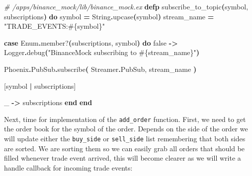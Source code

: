 \documentclass[
  oneside]{book}
\newenvironment{Shaded}{\begin{snugshade}}{\end{snugshade}}
\newcommand{\CommentTok}[1]{\textcolor[rgb]{0.56,0.35,0.01}{\textit{#1}}}
\newcommand{\ConstantTok}[1]{\textcolor[rgb]{0.56,0.35,0.01}{#1}}
\newcommand{\FunctionTok}[1]{\textcolor[rgb]{0.13,0.29,0.53}{\textbf{#1}}}
\newcommand{\KeywordTok}[1]{\textcolor[rgb]{0.13,0.29,0.53}{\textbf{#1}}}
\newcommand{\NormalTok}[1]{#1}
\newcommand{\OperatorTok}[1]{\textcolor[rgb]{0.81,0.36,0.00}{\textbf{#1}}}
\newcommand{\OtherTok}[1]{\textcolor[rgb]{0.56,0.35,0.01}{#1}}
\newcommand{\StringTok}[1]{\textcolor[rgb]{0.31,0.60,0.02}{#1}}
\begin{document}
\begin{Shaded}
\begin{Highlighting}[]
\CommentTok{\# /apps/binance\_mock/lib/binance\_mock.ex}
  \KeywordTok{defp}\NormalTok{ subscribe\_to\_topic}\FunctionTok{(}\NormalTok{symbol, subscriptions}\FunctionTok{)} \KeywordTok{do}
\NormalTok{    symbol }\OperatorTok{=} \ConstantTok{String}\OperatorTok{.}\NormalTok{upcase}\FunctionTok{(}\NormalTok{symbol}\FunctionTok{)}
\NormalTok{    stream\_name }\OperatorTok{=} \StringTok{"TRADE\_EVENTS:}\OtherTok{\#\{}\NormalTok{symbol}\OtherTok{\}}\StringTok{"}

    \KeywordTok{case} \ConstantTok{Enum}\OperatorTok{.}\NormalTok{member?}\FunctionTok{(}\NormalTok{subscriptions, symbol}\FunctionTok{)} \KeywordTok{do}
      \ConstantTok{false} \OperatorTok{{-}\textgreater{}}
        \ConstantTok{Logger}\OperatorTok{.}\NormalTok{debug}\FunctionTok{(}\StringTok{"BinanceMock subscribing to }\OtherTok{\#\{}\NormalTok{stream\_name}\OtherTok{\}}\StringTok{"}\FunctionTok{)}

        \ConstantTok{Phoenix}\OperatorTok{.}\ConstantTok{PubSub}\OperatorTok{.}\NormalTok{subscribe}\FunctionTok{(}
          \ConstantTok{Streamer}\OperatorTok{.}\ConstantTok{PubSub}\NormalTok{,}
\NormalTok{          stream\_name}
        \FunctionTok{)}

        \OtherTok{[}\NormalTok{symbol }\OperatorTok{|}\NormalTok{ subscriptions}\OtherTok{]}

\NormalTok{      \_ }\OperatorTok{{-}\textgreater{}}
\NormalTok{        subscriptions}
    \KeywordTok{end}
  \KeywordTok{end}
\end{Highlighting}
\end{Shaded}

Next, time for implementation of the \texttt{add\_order} function. First, we need to get the order book for the symbol of the order. Depends on the side of the order we will update either the \texttt{buy\_side} or \texttt{sell\_side} list remembering that both sides are sorted. We are sorting them so we can easily grab all orders that should be filled whenever trade event arrived, this will become clearer as we will write a handle callback for incoming trade events:
\end{document}
